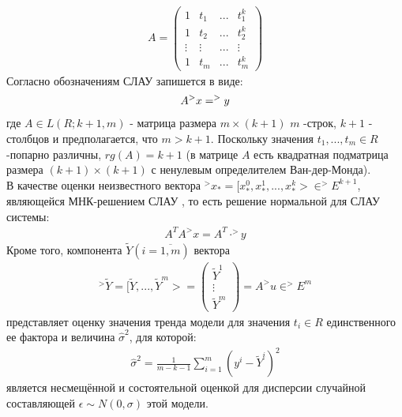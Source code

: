 \documentclass[__main__.tex]{subfiles}
\begin{document}
\begin{gather}
A = \begin{pmatrix}
1 & t_1 & ... & t_1^k\\
1 & t_2 & ... & t_2^k\\
\vdots & \vdots & ... & \vdots\\
1 & t_m & ... & t_m^k
\end{pmatrix}
\end{gather}
Согласно обозначениям  СЛАУ  запишется в виде:\\
\begin{gather}
\llabel{10:4}
A^>x=^>y
\end{gather}
где $A \in L(R;k+1,m)$ - матрица размера $m \times (k+1)$ $m$ -строк, $k+1$ - столбцов и предполагается, что $m>k+1$. Поскольку значения $t_1,...,t_m \in R$ -попарно различны, $rg(A) = k+1$ (в матрице $A$ есть квадратная подматрица размера $(k+1)\times(k+1)$ с
ненулевым определителем Ван-дер-Монда).\\
В качестве оценки неизвестного вектора $^>x_* =[x_*^0,x_*^1,...,x_*^k> \in ^>E^{k+1}$, являющейся МНК-решением СЛАУ , то есть решение нормальной для СЛАУ системы:
\begin{gather}
A^T A ^>x = A^T\cdot ^>y
\end{gather}
Кроме того, компонента $\widetilde{Y} (i = \overline{1,m})$ вектора
\begin{gather}
^>\widetilde{Y} = [\widetilde{Y},...,\widetilde{Y}^m> = \begin{pmatrix}
\widetilde{Y}^1\\
\vdots\\
\widetilde{Y}^m
\end{pmatrix}
 = A^>u \in ^>E^m
\end{gather}
представляет оценку значения тренда модели  для значения $t_i \in R$ единственного ее фактора и величина $\hat{\sigma}^2$, для которой:
\begin{gather}
\hat{\sigma}^2 = \frac{1}{m-k-1} \sum_{i=1}^m (y^i - \widetilde{Y}^i)^2
\end{gather}
является несмещённой и состоятельной оценкой для дисперсии случайной составляющей $\epsilon \sim N(0,\sigma)$ этой модели.\\
\end{document}
